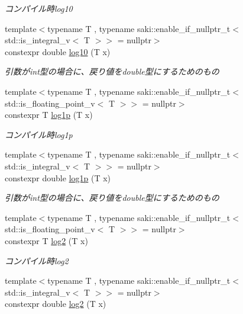 \begin{DoxyCompactItemize}
\begin{DoxyCompactList}\small\item\em コンパイル時log10 \end{DoxyCompactList}\item 
{\footnotesize template$<$typename T , typename saki\+::enable\+\_\+if\+\_\+nullptr\+\_\+t$<$ std\+::is\+\_\+integral\+\_\+v$<$ T $>$$>$  = nullptr$>$ }\\constexpr double \mbox{\hyperlink{namespacesaki_a7e5fde452567de6eaae1d5c481497757}{log10}} (T x)
\begin{DoxyCompactList}\small\item\em 引数がint型の場合に、戻り値をdouble型にするためのもの \end{DoxyCompactList}\item 
{\footnotesize template$<$typename T , typename saki\+::enable\+\_\+if\+\_\+nullptr\+\_\+t$<$ std\+::is\+\_\+floating\+\_\+point\+\_\+v$<$ T $>$$>$  = nullptr$>$ }\\constexpr T \mbox{\hyperlink{namespacesaki_ae0b2550b674acc69fa1fbe407917fdc7}{log1p}} (T x)
\begin{DoxyCompactList}\small\item\em コンパイル時log1p \end{DoxyCompactList}\item 
{\footnotesize template$<$typename T , typename saki\+::enable\+\_\+if\+\_\+nullptr\+\_\+t$<$ std\+::is\+\_\+integral\+\_\+v$<$ T $>$$>$  = nullptr$>$ }\\constexpr double \mbox{\hyperlink{namespacesaki_aec755aa143bd9a0d03c5ebb2dc5dd3de}{log1p}} (T x)
\begin{DoxyCompactList}\small\item\em 引数がint型の場合に、戻り値をdouble型にするためのもの \end{DoxyCompactList}\item 
{\footnotesize template$<$typename T , typename saki\+::enable\+\_\+if\+\_\+nullptr\+\_\+t$<$ std\+::is\+\_\+floating\+\_\+point\+\_\+v$<$ T $>$$>$  = nullptr$>$ }\\constexpr T \mbox{\hyperlink{namespacesaki_ac184cde6c3531e01531219e081e25452}{log2}} (T x)
\begin{DoxyCompactList}\small\item\em コンパイル時log2 \end{DoxyCompactList}\item 
{\footnotesize template$<$typename T , typename saki\+::enable\+\_\+if\+\_\+nullptr\+\_\+t$<$ std\+::is\+\_\+integral\+\_\+v$<$ T $>$$>$  = nullptr$>$ }\\constexpr double \mbox{\hyperlink{namespacesaki_a8cb2f664389aab32abc797d9a60db4dc}{log2}} (T x)

\end{DoxyCompactItemize}
